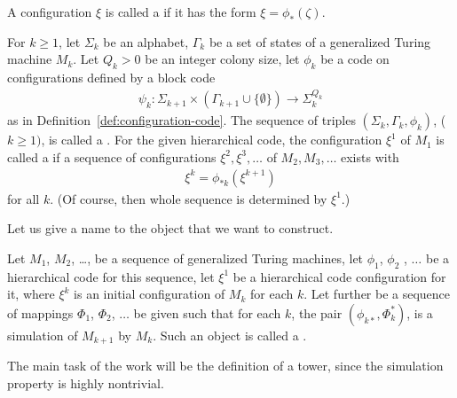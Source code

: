 \documentclass[12pt]{memoir}
\begin{document}
 \begin{definition}\label{def:code-config}
   A configuration \( \xi \) is called a  if 
it has the form \( \xi=\phi_{*}(\zeta) \).
 \end{definition}


\begin{definition}\label{def:hierarchical-code}
For \( k\ge 1 \), let \( \Sigma_k \) be an alphabet, \( \Gamma_k \) be
a set of states of a generalized Turing machine \( M_k \).
Let \( Q_k>0 \) be an integer colony size, let \( \phi_k \)
be a code on configurations defined by a block code
  \begin{align*}
       \psi_k: \Sigma_{k+1}\times(\Gamma_{k+1}\cup\{\emptyset\})
       \rightarrow \Sigma_k^{Q_k}
  \end{align*}
as in Definition~\ref{def:configuration-code}.
The sequence of triples \( (\Sigma_k,\Gamma_k,  \phi_k) \), (\( k\ge 1) \),  is
called a .
For the given hierarchical code, the configuration \( \xi^{1} \) of \( M_{1} \)
is called a  if a sequence
of configurations \( \xi^{2},\xi^{3},\dots \) of \( M_{2},M_{3},\dots \) exists with
\begin{align*}
 \xi^{k}=\phi_{*k}(\xi^{k+1})
 \end{align*} 
for all \( k \).
(Of course, then whole sequence is determined by \( \xi^{1} \).)
\end{definition}

Let us give a name to the object that we want to construct.

\begin{definition}[A tower]\label{def:tower}
Let \( M_1 \), \( M_2 \), \dots, be a sequence of generalized Turing machines,
let \( \phi_{1} \), \( \phi_{2} \) , \(\dots \) be a hierarchical code for this sequence,
let \( \xi^{1} \) be a hierarchical code configuration for it, where \( \xi^{k} \) is an
initial configuration of \( M_{k} \) for each \( k \).
Let further be a sequence of mappings \( \Phi_{1} \), \( \Phi_{2} \), \( \dots \) be
given such that for each \( k \), the pair \( (\phi_{k*},\Phi_{k}^{*}) \),
is a simulation of \( M_{k+1} \) by \( M_{k} \).
Such an object is called a .
\end{definition}

The main task of the work will be the definition of a tower, since the simulation
property is highly nontrivial.
\end{document}
